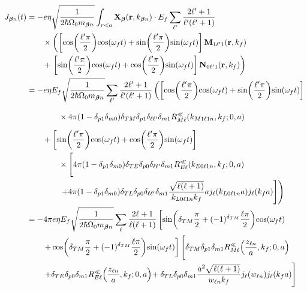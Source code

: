 \documentclass{article}
\begin{document}
\begin{equation}
\begin{split}
J_{\bm{\beta}n}(t) &= -e\eta\sqrt{\frac{1}{2\hbar\Omega_0m_{\bm{\beta}n}}}\int_{r<a}\mathbf{X}_{\bm{\beta}}(\mathbf{r},k_{\bm{\beta}n})\cdot E_f\sum_{\ell'}\frac{2\ell' + 1}{\ell'(\ell' + 1)}\\
&\qquad\times\left(\left[\cos\!\left(\frac{\ell'\pi}{2}\right)\!\cos(\omega_ft) + \sin\!\left(\frac{\ell'\pi}{2}\right)\!\sin(\omega_ft)\right]\mathbf{M}_{1\ell'1}(\mathbf{r},k_f)\right.\\
&\qquad + \left.\left[\sin\!\left(\frac{\ell'\pi}{2}\right)\!\cos(\omega_ft) + \cos\!\left(\frac{\ell'\pi}{2}\right)\!\sin(\omega_ft)\right]\mathbf{N}_{0\ell'1}(\mathbf{r},k_f)\right)\\
&= -e\eta E_f\sqrt{\frac{1}{2\hbar\Omega_0m_{\bm{\beta}n}}}\sum_{\ell'}\frac{2\ell' + 1}{\ell'(\ell' + 1)}\left( \left[\cos\!\left(\frac{\ell'\pi}{2}\right)\!\cos(\omega_ft) + \sin\!\left(\frac{\ell'\pi}{2}\right)\!\sin(\omega_ft)\right]\right.\\
&\qquad\qquad\times\vphantom{\frac{\sqrt{\ell(\ell + 1)}}{k_{L0\ell1n}k_f}} 4\pi(1 - \delta_{p1}\delta_{m0})\delta_{TM}\delta_{p1}\delta_{\ell\ell'}\delta_{m1}R_{M\ell}^\ll(k_{M1\ell1n},k_f;0,a)\\
&\qquad + \left[\sin\!\left(\frac{\ell'\pi}{2}\right)\!\cos(\omega_ft) + \cos\!\left(\frac{\ell'\pi}{2}\right)\!\sin(\omega_ft)\right]\\
&\qquad\qquad\times\left[ \vphantom{\frac{\sqrt{\ell(\ell + 1)}}{k_{L0\ell1n}k_f}} 4\pi(1 - \delta_{p1}\delta_{m0})\delta_{TE}\delta_{p0}\delta_{\ell\ell'}\delta_{m1}R_{E\ell}^\ll(k_{E0\ell1n},k_f;0,a)\right.\\
&\qquad\qquad\left.\left. + 4\pi(1 - \delta_{p1}\delta_{m0})\delta_{TL}\delta_{p0}\delta_{\ell\ell'}\delta_{m1}\frac{\sqrt{\ell(\ell + 1)}}{k_{L0\ell1n}k_f}aj_\ell(k_{L0\ell1n}a)j_\ell(k_fa)\right]\right)\\
&= -4\pi e\eta E_f\sqrt{\frac{1}{2\hbar\Omega_0m_{\bm{\beta}n}}}\sum_\ell\frac{2\ell + 1}{\ell(\ell + 1)}\left[\sin\!\left(\delta_{TM}\frac{\pi}{2} + (-1)^{\delta_{TM}}\frac{\ell\pi}{2}\right)\!\cos(\omega_ft)\right.\\
&\qquad\left. + \cos\!\left(\delta_{TM}\frac{\pi}{2} + (-1)^{\delta_{TM}}\frac{\ell\pi}{2}\right)\!\sin(\omega_ft)\right]\left[ \vphantom{\frac{a^2\sqrt{\ell(\ell + 1)}}{w_{\ell n}k_f}} \delta_{TM}\delta_{p1}\delta_{m1}R_{M\ell}^\ll\!\left(\frac{z_{\ell n}}{a},k_f;0,a\right)\!\right.\\
&\qquad\left. + \delta_{TE}\delta_{p0}\delta_{m1}R_{E\ell}^\ll\!\left(\frac{z_{\ell n}}{a},k_f;0,a\right)\! + \delta_{TL}\delta_{p0}\delta_{m1}\frac{a^2\sqrt{\ell(\ell + 1)}}{w_{\ell n}k_f}j_\ell(w_{\ell n})j_\ell(k_fa)\right]
\end{split}
\end{equation}
\end{document}
